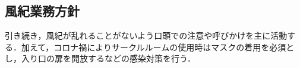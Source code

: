 \subsection*{風紀業務方針}


引き続き，風紀が乱れることがないよう口頭での注意や呼びかけを主に活動する．加えて，コロナ禍によりサークルルームの使用時はマスクの着用を必須とし，入り口の扉を開放するなどの感染対策を行う．
